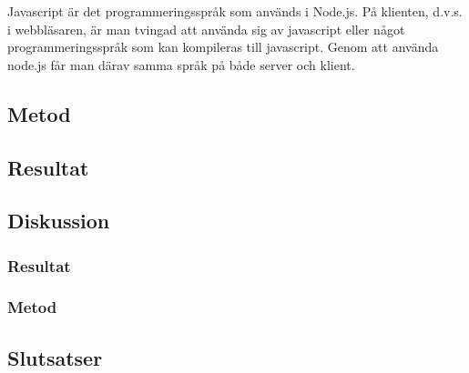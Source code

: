Javascript är det programmeringsspråk som används i Node.js. På klienten, d.v.s. i webbläsaren, är man tvingad att använda sig av javascript eller något programmeringsspråk som kan kompileras till javascript. Genom att använda node.js får man därav samma språk på både server och klient. \\
\subsection{Metod}

\subsection{Resultat}
\subsection{Diskussion}
\subsubsection{Resultat}
\subsubsection{Metod}
\subsection{Slutsatser}